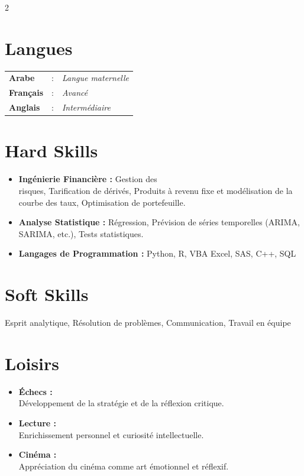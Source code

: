 \documentclass[11pt,asfal]{amdresume}
\begin{document}
\begin{paracol}{2}
\vspace{0.1cm}
\section{Langues}
\hspace{-0.8cm}
\begin{tabular}{lcl}
  \textbf{Arabe}     &  : & \textit{Langue maternelle} \\
  \textbf{Français}  &  : & \textit{Avancé} \\
  \textbf{Anglais}   &  : & \textit{Intermédiaire} \\
\end{tabular}

\vspace{0.1cm}
\section{Hard Skills}
\begin{itemize}
    \item \textbf{Ingénierie Financière :} Gestion des \\ risques, Tarification de dérivés, Produits à revenu fixe et modélisation de la courbe des taux, Optimisation de portefeuille.
\\ \divider
    \item \textbf{Analyse Statistique :} Régression, Prévision de séries temporelles (ARIMA, \\ SARIMA, etc.), Tests statistiques.
\\ \divider
    \item \textbf{Langages de Programmation :} Python, R, VBA Excel, SAS, C++, SQL
\end{itemize}

\section{Soft Skills}
Esprit analytique, Résolution de problèmes, Communication, Travail en équipe

\section{Loisirs}
\begin{itemize}[left=0.6cm]
    \item[\king] \textbf{Échecs :} \\ Développement de la stratégie et de la réflexion critique.
    \item[\faBook] \textbf{Lecture :} \\ Enrichissement personnel et curiosité intellectuelle.
    \item[\faTv] \textbf{Cinéma :} \\ Appréciation du cinéma comme art émotionnel et réflexif.
\end{itemize}

\end{paracol}
\end{document}
